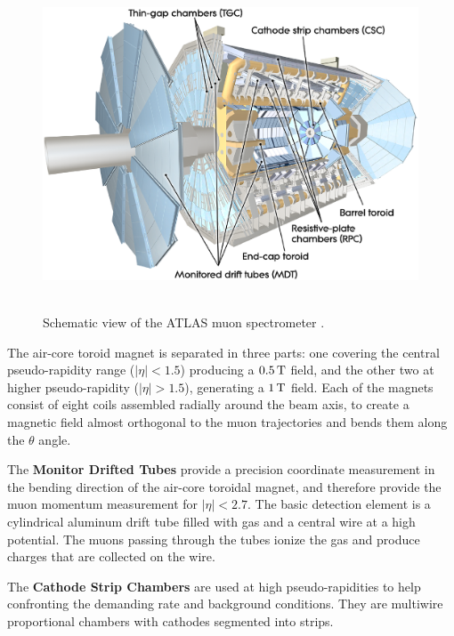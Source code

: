 \begin{figure}[!ht]
  \begin{center}
    \mbox{
      \includegraphics[width=0.995\textwidth]{ATLASdetector/Figures/MuonSystem.eps}
    }
  \end{center}
  \caption[Schematic view of the ATLAS muon spectrometer.]{Schematic view of the ATLAS muon spectrometer \cite{Evans:2008zzb}.}
  \label{fig:MuonSpectrometerSchema}
\end{figure}

The air-core toroid magnet is separated in three parts: one covering the central pseudo-rapidity range ($|\eta|<1.5$) producing a $\unit[0.5]{T}$ field, and the other two at higher pseudo-rapidity ($|\eta|>1.5$), generating a $\unit[1]{T}$ field.
Each of the magnets consist of eight coils assembled radially around the beam axis, to create a magnetic field almost orthogonal to the muon trajectories and bends them along the $\theta$ angle.

The {\bf Monitor Drifted Tubes} provide a precision coordinate measurement in the bending direction of the air-core toroidal magnet, and therefore provide the  muon momentum measurement for $|\eta|<2.7$.
The basic detection element is a cylindrical aluminum drift tube filled with gas and a central wire at a high potential. The muons passing through the tubes ionize the gas and produce charges that are collected on the wire.

The {\bf Cathode Strip Chambers} are used at high pseudo-rapidities to help confronting the demanding rate and background conditions.
They are multiwire proportional chambers with cathodes segmented into strips.

